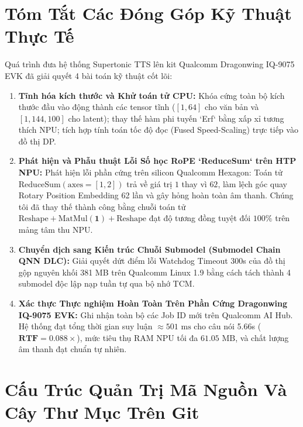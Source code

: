 \documentclass[11pt,a4paper,oneside,table]{report}
\begin{document}
\section{Tóm Tắt Các Đóng Góp Kỹ Thuật Thực Tế}
\label{sec:contributions}

Quá trình đưa hệ thống Supertonic TTS lên kit Qualcomm Dragonwing IQ-9075 EVK đã giải quyết 4 bài toán kỹ thuật cốt lõi:

\begin{contributionbox}
\begin{enumerate}
    \item \textbf{Tĩnh hóa kích thước và Khử toán tử CPU:}
    Khóa cứng toàn bộ kích thước đầu vào động thành các tensor tĩnh ($[1, 64]$ cho văn bản và $[1, 144, 100]$ cho latent); thay thế hàm phi tuyến `Erf` bằng xấp xỉ tương thích NPU; tích hợp tính toán tốc độ đọc (Fused Speed-Scaling) trực tiếp vào đồ thị DP.

    \item \textbf{Phát hiện và Phẫu thuật Lỗi Số học RoPE `ReduceSum` trên HTP NPU:}
    Phát hiện lỗi phần cứng trên silicon Qualcomm Hexagon: Toán tử $\text{ReduceSum}(\text{axes}=[1,2])$ trả về giá trị $1$ thay vì $62$, làm lệch góc quay Rotary Position Embedding 62 lần và gây hỏng hoàn toàn âm thanh. Chúng tôi đã thay thế thành công bằng chuỗi toán tử $\text{Reshape} + \text{MatMul}(\mathbf{1}) + \text{Reshape}$ đạt độ tương đồng tuyệt đối $100\%$ trên mảng tâm thu NPU.

    \item \textbf{Chuyển dịch sang Kiến trúc Chuỗi Submodel (Submodel Chain QNN DLC):}
    Giải quyết dứt điểm lỗi Watchdog Timeout 300s của đồ thị gộp nguyên khối 381 MB trên Qualcomm Linux 1.9 bằng cách tách thành 4 submodel độc lập nạp tuần tự qua bộ nhớ TCM.

    \item \textbf{Xác thực Thực nghiệm Hoàn Toàn Trên Phần Cứng Dragonwing IQ-9075 EVK:}
    Ghi nhận toàn bộ các Job ID mới trên Qualcomm AI Hub. Hệ thống đạt tổng thời gian suy luận $\approx 501\text{ ms}$ cho câu nói 5.66s ($\mathbf{RTF = 0.088\times}$), mức tiêu thụ RAM NPU tối đa $61.05\text{ MB}$, và chất lượng âm thanh đạt chuẩn tự nhiên.
\end{enumerate}
\end{contributionbox}

\section{Cấu Trúc Quản Trị Mã Nguồn Và Cây Thư Mục Trên Git}
\label{sec:project_structure_git}
\end{document}
